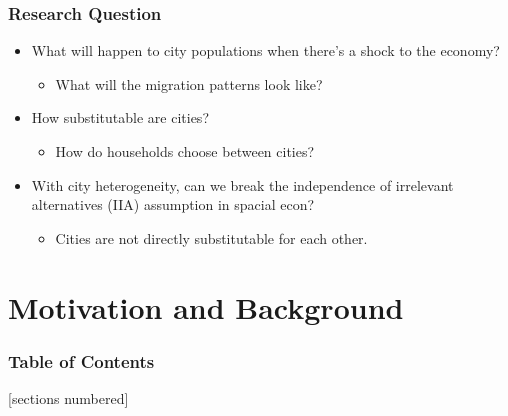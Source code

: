 \documentclass[serif, 9pt, aspectratio=32]{beamer}
\begin{document}
\begin{frame}
    \centering
    \frametitle{Research Question}
    \begin{itemize}
        \setlength{\itemsep}{3em}
        \item What will happen to city populations when there's a shock to the economy?
              \begin{itemize}
                  \item What will the migration patterns look like?
              \end{itemize}
        \item How substitutable are cities?
              \begin{itemize}
                  \item How do households choose between cities?
              \end{itemize}
        \item With city heterogeneity, can we break the independence of irrelevant alternatives (IIA) assumption in spacial econ?
              \begin{itemize}
                  \item Cities are not directly substitutable for each other.
              \end{itemize}
    \end{itemize}
\end{frame}

\section{Motivation and Background}

\begin{frame}
    \frametitle{Table of Contents}
    [sections numbered]
    \tableofcontents[currentsection]
\end{frame}
\end{document}
